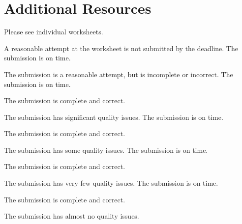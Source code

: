 \documentclass{../fal_assignment}
\begin{document}
\section*{Additional Resources}

Please see individual worksheets.


\begin{markingrubric}
%
        \grade\fail	A reasonable attempt at the worksheet is not submitted by the deadline.
        \grade 		The submission is on time.
        \par		The submission is a reasonable attempt, but is incomplete or incorrect.
        \grade 		The submission is on time.
        \par 		The submission is complete and correct.
        \par		The submission has significant quality issues.
        \grade 		The submission is on time.
        \par 		The submission is complete and correct.
        \par		The submission has some quality issues.
        \grade 		The submission is on time.
        \par 		The submission is complete and correct.
        \par		The submission has very few quality issues.
        \grade 		The submission is on time.
        \par 		The submission is complete and correct.
        \par		The submission has almost no quality issues.
\end{markingrubric}
\end{document}
